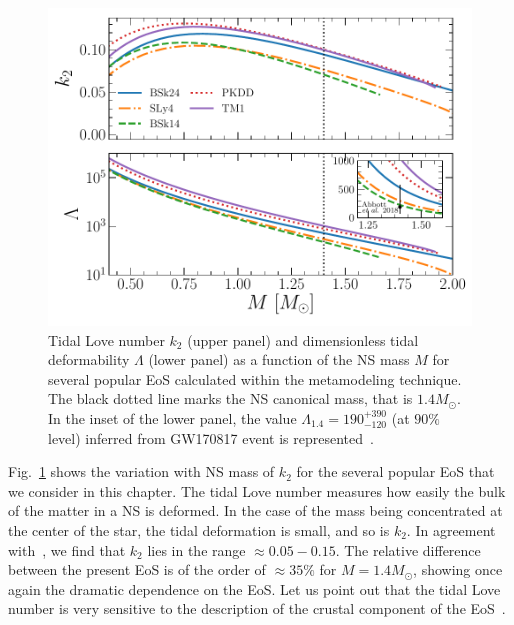 \begin{figure}[!t]
  \begin{center}
    \includegraphics[width=0.9\linewidth]{figures/tidal_popular.pdf}
  \end{center}
  \caption[Tidal Love number and dimensionless tidal deformability versus NS 
  mass for several popular EoS]{Tidal Love number $k_2$ (upper panel) and 
    dimensionless tidal deformability $\Lambda$ (lower panel) as a function of 
    the NS mass $M$ for several popular EoS calculated within the metamodeling 
  technique. The black dotted line marks the NS canonical mass, that is
$1.4M_\odot$. In the inset of the lower panel, the value 
$\Lambda_{1.4} = 190_{-120}^{+390}$ (at $90\%$ level) inferred from GW170817 
event is represented~\cite{GW1}.}\label{fig:tidal_popular}
\end{figure}

Fig.~\ref{fig:tidal_popular} shows the variation with NS mass of $k_2$ for the 
several popular EoS that we consider in this chapter. The tidal Love number
measures how easily the bulk of the matter in a NS is deformed. In the case
of the mass being concentrated at the center of the star, the tidal deformation 
is small, and so is $k_2$. In agreement with~\cite{Hinderer2010}, we find that 
$k_2$ lies in the range $\approx 0.05-0.15$. The relative difference between
the present EoS is of the order of $\approx 35\%$ for $M=1.4M_\odot$, showing
once again the dramatic dependence on the EoS. Let us point out that the tidal 
Love number is very sensitive to the description of the crustal component of 
the EoS~\cite{Piekarewicz2019}.

